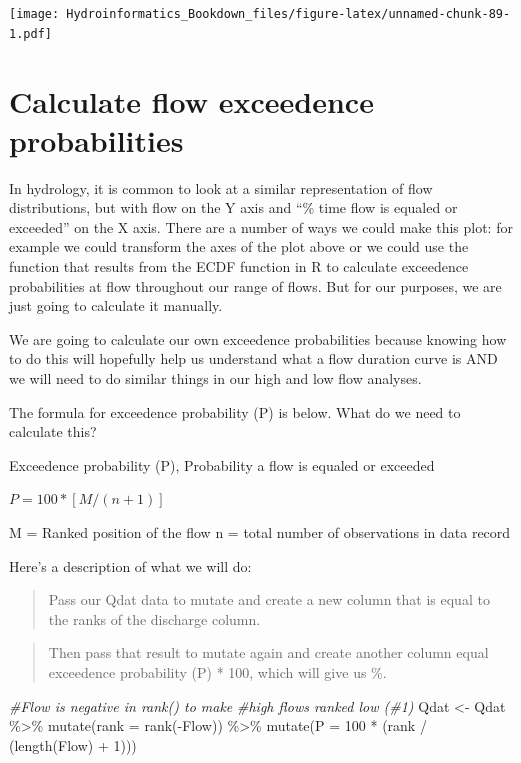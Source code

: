 \documentclass[
]{book}
\newenvironment{Shaded}{\begin{snugshade}}{\end{snugshade}}
\newcommand{\AttributeTok}[1]{\textcolor[rgb]{0.77,0.63,0.00}{#1}}
\newcommand{\CommentTok}[1]{\textcolor[rgb]{0.56,0.35,0.01}{\textit{#1}}}
\newcommand{\DecValTok}[1]{\textcolor[rgb]{0.00,0.00,0.81}{#1}}
\newcommand{\FunctionTok}[1]{\textcolor[rgb]{0.00,0.00,0.00}{#1}}
\newcommand{\NormalTok}[1]{#1}
\newcommand{\OtherTok}[1]{\textcolor[rgb]{0.56,0.35,0.01}{#1}}
\newcommand{\SpecialCharTok}[1]{\textcolor[rgb]{0.00,0.00,0.00}{#1}}
\begin{document}
\texttt{[image: Hydroinformatics\_Bookdown\_files/figure-latex/unnamed-chunk-89-1.pdf]}

\hypertarget{calculate-flow-exceedence-probabilities}{%
\section{Calculate flow exceedence probabilities}\label{calculate-flow-exceedence-probabilities}}

In hydrology, it is common to look at a similar representation of flow distributions, but with flow on the Y axis and ``\% time flow is equaled or exceeded'' on the X axis. There are a number of ways we could make this plot: for example we could transform the axes of the plot above or we could use the function that results from the ECDF function in R to calculate exceedence probabilities at flow throughout our range of flows. But for our purposes, we are just going to calculate it manually.

We are going to calculate our own exceedence probabilities because knowing how to do this will hopefully help us understand what a flow duration curve is AND we will need to do similar things in our high and low flow analyses.

The formula for exceedence probability (P) is below. What do we need to calculate this?

Exceedence probability (P), Probability a flow is equaled or exceeded

\(P = 100 * [M / (n + 1)]\)

M = Ranked position of the flow
n = total number of observations in data record

Here's a description of what we will do:

\begin{quote}
Pass our Qdat data to mutate and create a new column that is equal to the ranks of the discharge column.
\end{quote}

\begin{quote}
Then pass that result to mutate again and create another column equal exceedence probability (P) * 100, which will give us \%.
\end{quote}

\begin{Shaded}
\begin{Highlighting}[]
\CommentTok{\#Flow is negative in rank() to make }
\CommentTok{\#high flows ranked low (\#1)}
\NormalTok{Qdat }\OtherTok{\textless{}{-}}\NormalTok{ Qdat }\SpecialCharTok{\%\textgreater{}\%}
  \FunctionTok{mutate}\NormalTok{(}\AttributeTok{rank =} \FunctionTok{rank}\NormalTok{(}\SpecialCharTok{{-}}\NormalTok{Flow)) }\SpecialCharTok{\%\textgreater{}\%}
  \FunctionTok{mutate}\NormalTok{(}\AttributeTok{P =} \DecValTok{100} \SpecialCharTok{*}\NormalTok{ (rank }\SpecialCharTok{/}\NormalTok{ (}\FunctionTok{length}\NormalTok{(Flow) }\SpecialCharTok{+} \DecValTok{1}\NormalTok{)))}
\end{Highlighting}
\end{Shaded}
\end{document}
